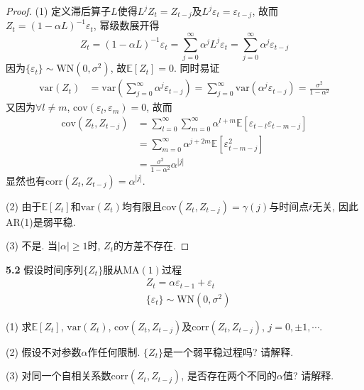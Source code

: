 \documentclass[cn,12pt,math=mtpro2,citestyle=gb7714-2015,bibstyle=gb7714-2015,twocol,mode=simple]{elegantbook}
\newcommand{\E}{\mathbb{E}}
\newcommand{\var}{\text{var}}
\begin{document}
  \begin{proof}
    (1) 定义滞后算子$L$使得$L^jZ_t=Z_{t-j}$及$L^j\varepsilon_t=\varepsilon_{t-j}$, 故而$Z_t=(1-\alpha L)^{-1}\varepsilon_t$, 幂级数展开得
    $$Z_t=(1-\alpha L)^{-1}\varepsilon_t=\sum_{j=0}^{\infty}\alpha^jL^j\varepsilon_t=\sum_{j=0}^{\infty}\alpha^j\varepsilon_{t-j}$$
    因为$\{\varepsilon_t\}\sim\text{WN}(0,\sigma^2)$, 故$\E[Z_t]=0$. 同时易证
    \begin{align*}
    \var(Z_t)&=\var\left(\sum_{j=0}^{\infty}\alpha^j\varepsilon_{t-j}\right)
    =\sum_{j=0}^{\infty}\var(\alpha^j\varepsilon_{t-j})=\frac{\sigma^2}{1-\alpha^2}
    \end{align*}
    又因为$\forall l\neq m$, $\text{cov}(\varepsilon_l,\varepsilon_m)=0$, 故而
    \begin{align*}
    \text{cov}(Z_t,Z_{t-j})&=\sum_{l=0}^{\infty}\sum_{m=0}^{\infty}\alpha^{l+m}\E[\varepsilon_{t-l}\varepsilon_{t-m-j}] \\
    &=\sum_{m=0}^{\infty}\alpha^{j+2m}\E[\varepsilon_{t-m-j}^2] \\
    &=\frac{\sigma^2}{1-\alpha^2}\alpha^{|j|}
    \end{align*}
    显然也有$\text{corr}(Z_{t},Z_{t-j})=\alpha^{|j|}$.

    (2) 由于$\E[Z_t]$和$\var(Z_t)$均有限且$\text{cov}(Z_t,Z_{t-j})=\gamma(j)$与时间点$t$无关, 因此AR(1)是弱平稳.

    (3) 不是. 当$|\alpha|\geq1$时, $Z_t$的方差不存在.
  \end{proof}

\textbf{5.2} 假设时间序列$\{Z_t\}$服从$\text{MA}(1)$过程
    \begin{align*}
  &Z_t=\alpha \varepsilon_{t-1}+\varepsilon_t \\
  &\{\varepsilon_t\}\sim \text{WN}(0,\sigma^2)
  \end{align*}

(1) 求$\E[Z_t]$, $\var(Z_t)$, $\text{cov}(Z_t,Z_{t-j})$及$\text{corr}(Z_t,Z_{t-j})$, $j=0, \pm 1, \cdots$.

(2) 假设不对参数$\alpha$作任何限制. $\{Z_t\}$是一个弱平稳过程吗? 请解释.

(3) 对同一个自相关系数$\text{corr}(Z_{t},Z_{t-j})$, 是否存在两个不同的$\alpha$值? 请解释.
\end{document}
